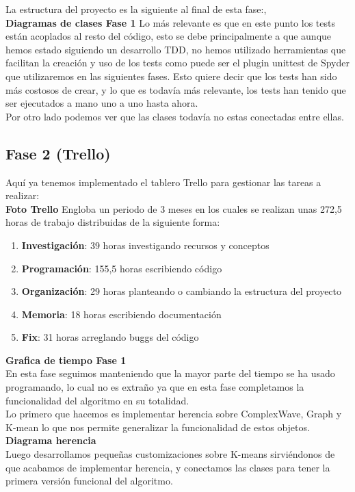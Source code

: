 \documentclass[12pt,a4paper]{article}
\begin{document}
	La estructura del proyecto es la siguiente al final de esta fase:,\\
	\textbf{Diagramas de clases Fase 1}
	Lo más relevante es que en este punto los tests están acoplados al resto del código, esto se debe principalmente a que aunque hemos estado siguiendo un desarrollo TDD, no hemos utilizado herramientas que facilitan la creación y uso de los tests como puede ser el plugin unittest de Spyder que utilizaremos en las siguientes fases. Esto quiere decir que los tests han sido más costosos de crear, y lo que es todavía más relevante, los tests han tenido que ser ejecutados a mano uno a uno hasta ahora.\\ 
	Por otro lado podemos ver que las clases todavía no estas conectadas entre ellas.\\
	\subsection{Fase 2 (Trello)}
		Aquí ya tenemos implementado el tablero Trello para gestionar las tareas a realizar:\\
	\textbf{Foto Trello}
	Engloba un periodo de 3 meses en los cuales se realizan unas 272,5 horas de trabajo distribuidas de la siguiente forma:\\
	\begin{enumerate}
	\item \textbf{Investigación}: 39 horas investigando recursos y conceptos
	\item \textbf{Programación}: 155,5 horas escribiendo código
	\item \textbf{Organización}: 29 horas planteando o cambiando la estructura del proyecto
	\item \textbf{Memoria}: 18 horas escribiendo documentación
	\item \textbf{Fix}: 31 horas arreglando buggs del código
	\end{enumerate}
	\textbf{Grafica de tiempo Fase 1}\\
	En esta fase seguimos manteniendo que la mayor parte del tiempo se ha usado programando, lo cual no es extraño ya que en esta fase completamos la funcionalidad del algoritmo en su totalidad.\\
	Lo primero que hacemos es implementar herencia sobre ComplexWave, Graph y K-mean lo que nos permite generalizar la funcionalidad de estos objetos.\\
	\textbf{Diagrama herencia}\\
	Luego desarrollamos pequeñas customizaciones sobre K-means sirviéndonos de que acabamos de implementar herencia, y conectamos las clases para tener la primera versión funcional del algoritmo.\\
\end{document}
